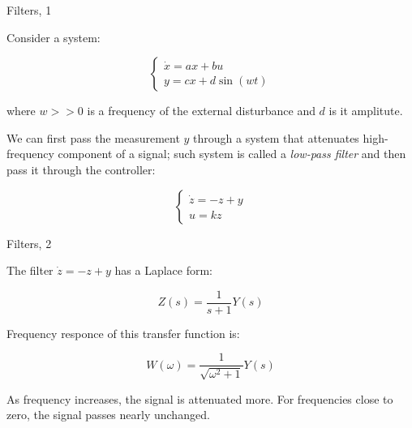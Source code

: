 \documentclass{beamer}
\begin{document}
\begin{frame}{Filters, 1}
	\begin{flushleft}
		
		Consider a system:
		
		\begin{equation}
			\begin{cases}
				\dot{ x }  = 
				ax+bu
				\\
				y = c x + d \sin(wt)
			\end{cases}
		\end{equation}
		
		where $w >>0$ is a frequency of the external disturbance and $d$ is it amplitute.
		
		\bigskip
		
		We can first pass the measurement $y$ through a system that attenuates high-frequency component of a signal; such system is called a \emph{low-pass filter} and then pass it through the controller:
		
		\begin{equation}
			\begin{cases}
				\dot{ z }  = 
				-z+y
				\\
				u = k z
			\end{cases}
		\end{equation}
		 
		
	\end{flushleft}
\end{frame}




\begin{frame}{Filters, 2}
	\begin{flushleft}
		
		The filter $\dot{ z }  = 
		-z+y$ has a Laplace form:
		
		\begin{equation}
			Z(s) = \frac{1}{s+1} Y(s)
		\end{equation}
		
		Frequency responce of this transfer function is:
		
		\begin{equation}
			W(\omega) = \frac{1}{\sqrt{\omega^2 + 1}} Y(s)
		\end{equation}
		
		As frequency increases, the signal is attenuated more. For frequencies close to zero, the signal passes nearly unchanged.
		
	\end{flushleft}
\end{frame}


\myqrframe
\end{document}
